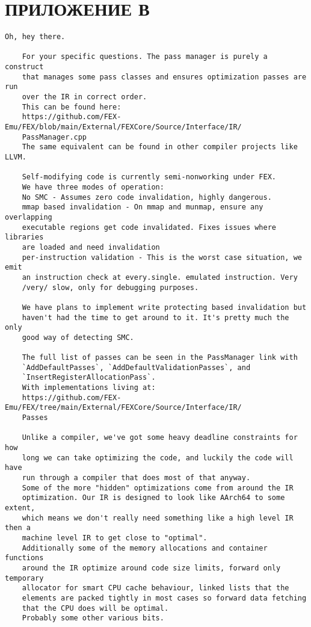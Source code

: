 \section*{ПРИЛОЖЕНИЕ В}

\begin{Verbatim}[fontsize=\footnotesize]
	Oh, hey there.
	
	For your specific questions. The pass manager is purely a construct
	that manages some pass classes and ensures optimization passes are run
	over the IR in correct order.
	This can be found here:
	https://github.com/FEX-Emu/FEX/blob/main/External/FEXCore/Source/Interface/IR/
	PassManager.cpp
	The same equivalent can be found in other compiler projects like LLVM.
	
	Self-modifying code is currently semi-nonworking under FEX.
	We have three modes of operation:
	No SMC - Assumes zero code invalidation, highly dangerous.
	mmap based invalidation - On mmap and munmap, ensure any overlapping
	executable regions get code invalidated. Fixes issues where libraries
	are loaded and need invalidation
	per-instruction validation - This is the worst case situation, we emit
	an instruction check at every.single. emulated instruction. Very
	/very/ slow, only for debugging purposes.
	
	We have plans to implement write protecting based invalidation but
	haven't had the time to get around to it. It's pretty much the only
	good way of detecting SMC.
	
	The full list of passes can be seen in the PassManager link with
	`AddDefaultPasses`, `AddDefaultValidationPasses`, and
	`InsertRegisterAllocationPass`.
	With implementations living at:
	https://github.com/FEX-Emu/FEX/tree/main/External/FEXCore/Source/Interface/IR/
	Passes
	
	Unlike a compiler, we've got some heavy deadline constraints for how
	long we can take optimizing the code, and luckily the code will have
	run through a compiler that does most of that anyway.
	Some of the more "hidden" optimizations come from around the IR
	optimization. Our IR is designed to look like AArch64 to some extent,
	which means we don't really need something like a high level IR then a
	machine level IR to get close to "optimal".
	Additionally some of the memory allocations and container functions
	around the IR optimize around code size limits, forward only temporary
	allocator for smart CPU cache behaviour, linked lists that the
	elements are packed tightly in most cases so forward data fetching
	that the CPU does will be optimal.
	Probably some other various bits.
	

\end{Verbatim}
